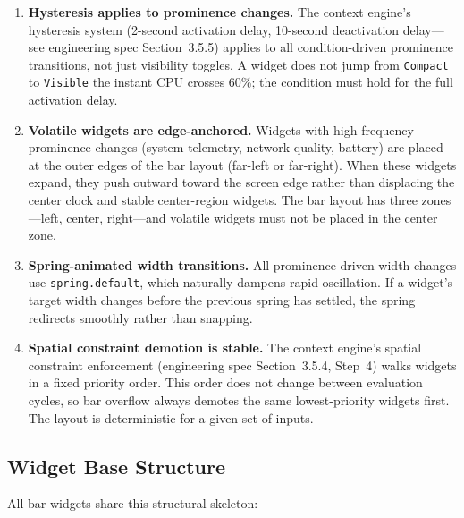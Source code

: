 \documentclass[11pt,a4paper]{article}
\begin{document}
\begin{enumerate}[leftmargin=1.5em, itemsep=3pt]
  \item \textbf{Hysteresis applies to prominence changes.} The context engine's hysteresis system (2-second activation delay, 10-second deactivation delay---see engineering spec Section~3.5.5) applies to all condition-driven prominence transitions, not just visibility toggles. A widget does not jump from \texttt{Compact} to \texttt{Visible} the instant CPU crosses 60\%; the condition must hold for the full activation delay.

  \item \textbf{Volatile widgets are edge-anchored.} Widgets with high-frequency prominence changes (system telemetry, network quality, battery) are placed at the outer edges of the bar layout (far-left or far-right). When these widgets expand, they push outward toward the screen edge rather than displacing the center clock and stable center-region widgets. The bar layout has three zones---left, center, right---and volatile widgets must not be placed in the center zone.

  \item \textbf{Spring-animated width transitions.} All prominence-driven width changes use \texttt{spring.default}, which naturally dampens rapid oscillation. If a widget's target width changes before the previous spring has settled, the spring redirects smoothly rather than snapping.

  \item \textbf{Spatial constraint demotion is stable.} The context engine's spatial constraint enforcement (engineering spec Section~3.5.4, Step~4) walks widgets in a fixed priority order. This order does not change between evaluation cycles, so bar overflow always demotes the same lowest-priority widgets first. The layout is deterministic for a given set of inputs.
\end{enumerate}

\subsection{Widget Base Structure}

All bar widgets share this structural skeleton:
\end{document}
